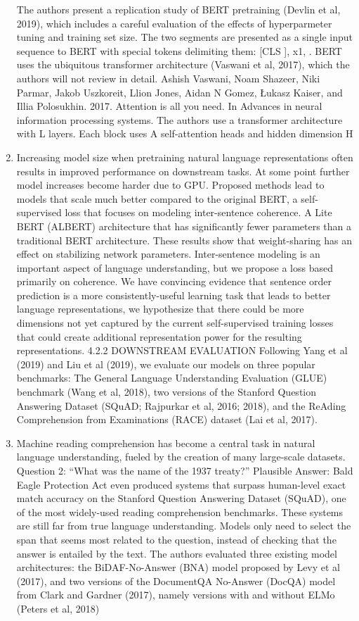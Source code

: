 \documentclass[11pt]{article}
\begin{document}
\begin{enumerate}
    The authors present a replication study of BERT pretraining (Devlin et al, 2019), which includes a careful evaluation of the effects of hyperparmeter tuning and training set size.
    The two segments are presented as a single input sequence to BERT with special tokens delimiting them: [CLS ], x1, .
    BERT uses the ubiquitous transformer architecture (Vaswani et al, 2017), which the authors will not review in detail.
    Ashish Vaswani, Noam Shazeer, Niki Parmar, Jakob Uszkoreit, Llion Jones, Aidan N Gomez, Łukasz Kaiser, and Illia Polosukhin. 2017. Attention is all you need. In Advances in neural information processing systems.
    The authors use a transformer architecture with L layers.
    Each block uses A self-attention heads and hidden dimension H\cite{roberta}
    \item Increasing model size when pretraining natural language representations often results in improved performance on downstream tasks. At some point further model increases become harder due to GPU. Proposed methods lead to models that scale much better compared to the original BERT, a self-supervised loss that focuses on modeling inter-sentence coherence. A Lite BERT (ALBERT) architecture that has significantly fewer parameters than a traditional BERT architecture. These results show that weight-sharing has an effect on stabilizing network parameters. Inter-sentence modeling is an important aspect of language understanding, but we propose a loss based primarily on coherence. We have convincing evidence that sentence order prediction is a more consistently-useful learning task that leads to better language representations, we hypothesize that there could be more dimensions not yet captured by the current self-supervised training losses that could create additional representation power for the resulting representations. 4.2.2 DOWNSTREAM EVALUATION Following Yang et al (2019) and Liu et al (2019), we evaluate our models on three popular benchmarks: The General Language Understanding Evaluation (GLUE) benchmark (Wang et al, 2018), two versions of the Stanford Question Answering Dataset (SQuAD; Rajpurkar et al, 2016; 2018), and the ReAding Comprehension from Examinations (RACE) dataset (Lai et al, 2017). \cite{albert}
    \item Machine reading comprehension has become a central task in natural language understanding, fueled by the creation of many large-scale datasets. Question 2: “What was the name of the 1937 treaty?” Plausible Answer: Bald Eagle Protection Act even produced systems that surpass human-level exact match accuracy on the Stanford Question Answering Dataset (SQuAD), one of the most widely-used reading comprehension benchmarks. These systems are still far from true language understanding. Models only need to select the span that seems most related to the question, instead of checking that the answer is entailed by the text. The authors evaluated three existing model architectures: the BiDAF-No-Answer (BNA) model proposed by Levy et al (2017), and two versions of the DocumentQA No-Answer (DocQA) model from Clark and Gardner (2017), namely versions with and without ELMo (Peters et al, 2018)

\end{enumerate}
\end{document}
